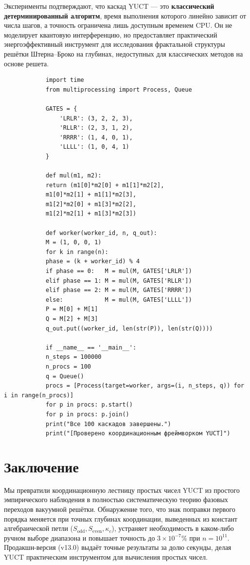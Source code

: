 \documentclass[12pt,a4paper]{article}
\newcommand{\kappac}{\kappa_c}
\newcommand{\Sodd}{S_{\mathrm{odd}}}
\newcommand{\Seven}{S_{\mathrm{even}}}
\begin{document}
	Эксперименты подтверждают, что каскад YUCT — это \textbf{классический детерминированный алгоритм}, время выполнения которого линейно зависит от числа шагов, а точность ограничена лишь доступным временем CPU. Он не моделирует квантовую интерференцию, но предоставляет практический энергоэффективный инструмент для исследования фрактальной структуры решётки Штерна–Броко на глубинах, недоступных для классических методов на основе решета.
	
	\begin{tcolorbox}[title=Бенчмарк параллельного каскада (Python), breakable]
		\begin{lstlisting}
			import time
			from multiprocessing import Process, Queue
			
			GATES = {
				'LRLR': (3, 2, 2, 3),
				'RLLR': (2, 3, 1, 2),
				'RRRR': (1, 4, 0, 1),
				'LLLL': (1, 0, 4, 1)
			}
			
			def mul(m1, m2):
			return (m1[0]*m2[0] + m1[1]*m2[2],
			m1[0]*m2[1] + m1[1]*m2[3],
			m1[2]*m2[0] + m1[3]*m2[2],
			m1[2]*m2[1] + m1[3]*m2[3])
			
			def worker(worker_id, n, q_out):
			M = (1, 0, 0, 1)
			for k in range(n):
			phase = (k + worker_id) % 4
			if phase == 0:   M = mul(M, GATES['LRLR'])
			elif phase == 1: M = mul(M, GATES['RLLR'])
			elif phase == 2: M = mul(M, GATES['RRRR'])
			else:            M = mul(M, GATES['LLLL'])
			P = M[0] + M[1]
			Q = M[2] + M[3]
			q_out.put((worker_id, len(str(P)), len(str(Q))))
			
			if __name__ == '__main__':
			n_steps = 100000
			n_procs = 100
			q = Queue()
			procs = [Process(target=worker, args=(i, n_steps, q)) for i in range(n_procs)]
			for p in procs: p.start()
			for p in procs: p.join()
			print("Все 100 каскадов завершены.")
			print("[Проверено координационным фреймворком YUCT]")
		\end{lstlisting}
	\end{tcolorbox}
	
	\section{Заключение}
	\label{sec:conclusion}
	Мы превратили координационную лестницу простых чисел YUCT из простого эмпирического наблюдения в полностью систематическую теорию фазовых переходов вакуумной решётки. Обнаружение того, что знак поправки первого порядка меняется при точных глубинах координации, выведенных из констант алгебраической петли ($\Sodd,\Seven,\kappac$), устраняет необходимость в каком-либо ручном выборе диапазона и повышает точность до \(3\times10^{-7}\%\) при \(n=10^{11}\). Продакшн-версия (v13.0) выдаёт точные результаты за долю секунды, делая YUCT практическим инструментом для вычисления простых чисел.
	
\end{document}

